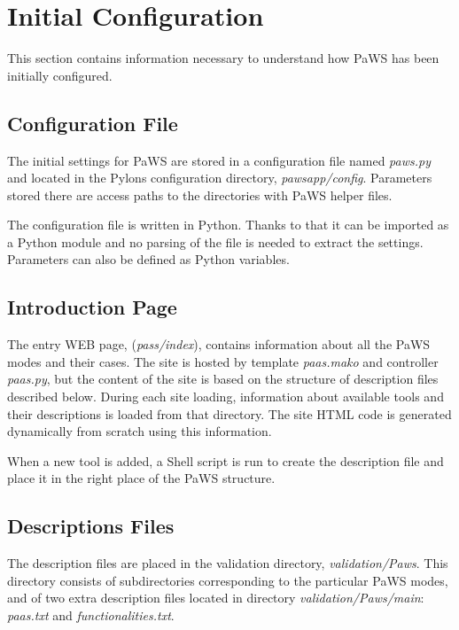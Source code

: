 \section{Initial Configuration}
\label{currentconfiguration}

This section contains information necessary to understand how PaWS has
been initially configured.

\subsection{Configuration File}

The initial settings for PaWS are stored in a configuration file named
\emph{paws.py} and located in the Pylons configuration directory,
\emph{pawsapp/config}. Parameters stored there are access paths to the
directories with PaWS helper files.

The configuration file is written in Python. Thanks to that it can be
imported as a Python module and no parsing of the file is needed to
extract the settings. Parameters can also be defined as Python
variables.

\subsection{Introduction Page}

The entry WEB page, (\emph{pass/index}), contains information about all
the PaWS modes and their cases. The site is hosted by template
\emph{paas.mako} and controller \emph{paas.py}, but the content of the
site is based on the structure of description files described
below. During each site loading, information about available tools and
their descriptions is loaded from that directory. The site HTML code
is generated dynamically from scratch using this information.

When a new tool is added, a Shell script is run to create the
description file and place it in the right place of the PaWS structure.

\subsection{Descriptions Files}

The description files are placed in the validation directory,
\emph{validation/Paws}. This directory consists of subdirectories
corresponding to the particular PaWS modes, and of two extra description
files located in directory \emph{validation/Paws/main}:
\emph{paas.txt} and \emph{functionalities.txt}.

